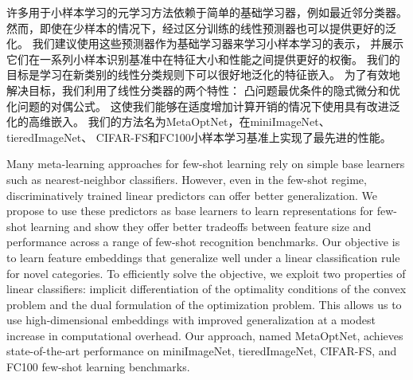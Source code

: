 
\begin{cabstract}
    许多用于小样本学习的元学习方法依赖于简单的基础学习器，例如最近邻分类器。
    然而，即使在少样本的情况下，经过区分训练的线性预测器也可以提供更好的泛化。
    我们建议使用这些预测器作为基础学习器来学习小样本学习的表示，
    并展示它们在一系列小样本识别基准中在特征大小和性能之间提供更好的权衡。
    我们的目标是学习在新类别的线性分类规则下可以很好地泛化的特征嵌入。
    为了有效地解决目标，我们利用了线性分类器的两个特性：
    凸问题最优条件的隐式微分和优化问题的对偶公式。
    这使我们能够在适度增加计算开销的情况下使用具有改进泛化的高维嵌入。
    我们的方法名为MetaOptNet，在miniImageNet、tieredImageNet、
    CIFAR-FS和FC100小样本学习基准上实现了最先进的性能。


\end{cabstract}

\begin{eabstract}
    Many meta-learning approaches for few-shot learning rely on 
    simple base learners such as nearest-neighbor classifiers.
     However, even in the few-shot regime, discriminatively trained linear predictors can offer better generalization. 
     We propose to use these predictors as base learners to learn representations for 
     few-shot learning and show they offer better tradeoffs between feature size and 
     performance across a range of few-shot recognition benchmarks. 
     Our objective is to learn feature embeddings that generalize well under a 
     linear classification rule for novel categories. To efficiently solve the objective, 
     we exploit two properties of linear classifiers: implicit differentiation of the optimality 
     conditions of the convex problem and the dual formulation of the optimization problem. 
     This allows us to use high-dimensional embeddings with improved generalization at a modest increase 
     in computational overhead. Our approach, named MetaOptNet, achieves state-of-the-art performance on 
     miniImageNet, tieredImageNet, CIFAR-FS, and FC100 few-shot learning benchmarks.
\end{eabstract}